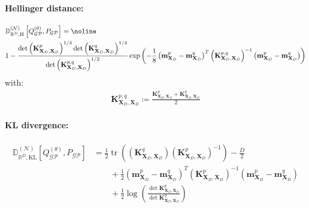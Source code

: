 \documentclass{article}
\newcommand{\tr}{\operatorname{tr}}
\newcommand{\GP}{\operatorname{\mathcal{GP}}}
\numberwithin{equation}{section}
\begin{document}
\paragraph{Hellinger distance:} 
\begin{align}
    & \mathbb{D}_{\mathbb{R}^D, \text{H}}^{(\mathcal{N})} \left[Q_{\GP}^{(\theta)}, P_{\GP}\right] = \noline \\
    & 1 - \frac{\det\left(\mathbf{K}_{\mathbf{X}_D, \mathbf{X}_D}^p\right)^{1/4}\det\left(\mathbf{K}_{\mathbf{X}_D, \mathbf{X}_D}^q\right)^{1/4}}{\det\left(\mathbf{K}_{\mathbf{X}_D, \mathbf{X}_D}^{p, q}\right)^{1/2}}\exp\left(-\frac{1}{8}\left(\mathbf{m}_{\mathbf{X}_D}^p - \mathbf{m}_{\mathbf{X}_D}^q\right)^T \left(\mathbf{K}_{\mathbf{X}_D, \mathbf{X}_D}^{p, q}\right)^{-1}\left(\mathbf{m}_{\mathbf{X}_D}^p - \mathbf{m}_{\mathbf{X}_D}^q\right)\right)
\end{align}
with:
\begin{align}
    \mathbf{K}_{\mathbf{X}_D, \mathbf{X}_D}^{p, q} \coloneqq \frac{\mathbf{K}_{\mathbf{X}_D, \mathbf{X}_D}^{p} + \mathbf{K}_{\mathbf{X}_D, \mathbf{X}_D}^{q}}{2}
\end{align}

\paragraph{KL divergence:} 
\begin{align}
    \mathbb{D}_{\mathbb{R}^D, \text{KL}}^{(\mathcal{N})} \left[Q_{\GP}^{(\theta)}, P_{\GP}\right] &= \frac{1}{2}\tr\left(\left(\mathbf{K}_{\mathbf{X}_D, \mathbf{X}_D}^q \right)\left(\mathbf{K}_{\mathbf{X}_D, \mathbf{X}_D}^p\right)^{-1}\right) -\frac{D}{2}\nonumber \\
    & \qquad  +\frac{1}{2}  \left(\mathbf{m}_{\mathbf{X}_D}^p - \mathbf{m}_{\mathbf{X}_D}^q\right)^T \left(\mathbf{K}_{\mathbf{X}_D, \mathbf{X}_D}^{p}\right)^{-1}\left(\mathbf{m}_{\mathbf{X}_D}^p - \mathbf{m}_{\mathbf{X}_D}^q\right) \nonumber \\
    & \qquad + \frac{1}{2} \log\left(\frac{\det \mathbf{K}_{\mathbf{X}_D, \mathbf{X}_D}^p}{\det \mathbf{K}_{\mathbf{X}_D, \mathbf{X}_D}^q}\right)
\end{align}
\end{document}
